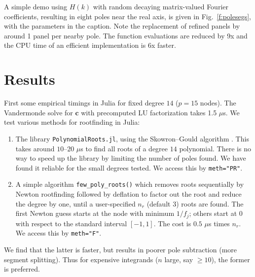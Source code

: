 \documentclass[11pt]{article}
\newcommand{\ben}{\begin{enumerate}}
\newcommand{\een}{\end{enumerate}}
\newcommand{\mbf}[1]{{\mathbf #1}}
\begin{document}
A simple demo using $H(k)$ with random decaying matrix-valued Fourier coefficients,
resulting in eight poles near the real axis,
is given in Fig.~\ref{f:polesegs},
with the parameters in the caption.
Note the replacement of refined panels by around 1 panel per nearby pole.
The function evaluations are reduced by 9x and the CPU time
of an efficient implementation is 6x faster.


\section{Results}

First some empirical timings in Julia for fixed degree $14$ ($p=15$ nodes).
The Vandermonde solve for $\mbf{c}$ with precomputed LU factorization
takes 1.5 $\mu$s.
We test various methods for rootfinding in Julia:
\ben
\item
  The library {\tt PolynomialRoots.jl}, using the Skowron--Gould algorithm \cite{skowron}.
  This takes around $10$--$20$ $\mu$s to find all roots of a degree $14$ polynomial.
  There is no way to speed up the library by limiting the number of poles found.
  We have found it reliable for the small degrees tested.
  We access this by {\tt meth="PR"}.  
\item A simple algorithm
{\tt few\_poly\_roots()}
  which removes roots sequentially by Newton rootfinding
  followed by deflation to factor out the root and reduce the degree by one,
  until a user-specified $n_r$ (default 3) roots are found.
  The first Newton guess starts at the node with minimum $1/f_j$; others start at
  $0$ with respect to the standard interval $[-1,1]$.
  The cost is $0.5$ $\mu$s times $n_r$.
  We access this by {\tt meth="F"}.
\een
We find that the latter is faster, but results in
poorer pole subtraction (more segment splitting).
Thus for expensive integrands ($n$ large, say $\ge 10$), the former is preferred.
\end{document}

